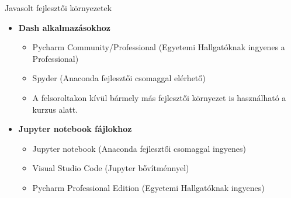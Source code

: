 \documentclass[english, aspectratio=169]{beamer}
\begin{document}
\begin{frame}{Javasolt fejlesztői környezetek}
	    \begin{itemize}
		\item \textbf{Dash alkalmazásokhoz}
		\begin{itemize}
			\item Pycharm Community/Professional (Egyetemi Hallgatóknak ingyenes a Professional)
			\item Spyder (Anaconda fejlesztői csomaggal elérhető)
			\item A felsoroltakon kívül bármely más fejlesztői környezet is használható a kurzus alatt.
		\end{itemize}
		\item \textbf{Jupyter notebook fájlokhoz}
		\begin{itemize}
			\item Jupyter notebook (Anaconda fejlesztői csomaggal ingyenes)
			\item Visual Studio Code (Jupyter bővítménnyel)
			\item Pycharm Professional Edition (Egyetemi Hallgatóknak ingyenes)
		\end{itemize}
	\end{itemize}
\end{frame}
\end{document}
